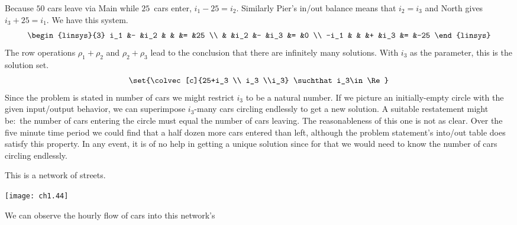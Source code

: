 \begin{exercises}
\begin{answer}
\begin{exparts}
           Because $50$ cars leave via Main while $25$~cars enter, 
           $i_1-25=i_2$.
           Similarly Pier's in/out balance means that $i_2=i_3$ and
           North gives $i_3+25=i_1$. 
           We have this system.
           \begin{equation*}
             \begin{linsys}{3}
               i_1  &-  &i_2  &   &     &=  &25  \\
                    &   &i_2  &-  &i_3  &=  &0   \\
              -i_1  &   &     &+  &i_3  &=  &-25
             \end{linsys}
           \end{equation*}
        \partsitem 
           The row operations $\rho_1+\rho_2$ and $\rho_2+\rho_3$ lead
           to the conclusion that there are infinitely many solutions.
           With $i_3$ as the parameter, this is the solution set.
           \begin{equation*}
             \set{\colvec[c]{25+i_3  \\ i_3  \\i_3} \suchthat i_3\in\Re}
           \end{equation*}
           Since the problem is stated in number of cars we
           might restrict $i_3$ to be a natural number.
        \partsitem
           If we picture an initially-empty circle with the given input/output
           behavior, we can superimpose $i_3$-many cars circling endlessly
           to get a new solution.
        \partsitem
           A suitable restatement might be:~the number of cars entering the 
           circle must equal the number of cars leaving.
           The reasonableness of this one is not as clear.
           Over the five minute time period we could find that
           a half dozen more cars entered than left, 
           although the problem statement's into/out table 
           does satisfy this property.
           In any event, it is of no help in getting a unique solution
           since for that we would need to know the number of cars circling
           endlessly.
      \end{exparts}
    \end{answer}
  \item 
     This is a network of streets. 
          \begin{center}
            \texttt{[image: ch1.44]}
             \end{center}
         We can observe the hourly flow of cars into this network's

\end{exercises}
